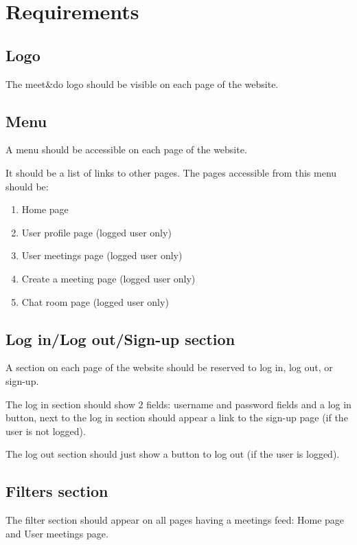 \documentclass[conference]{IEEEtran}
\begin{document}
\section{Requirements}

\subsection{Logo}

The meet\&do logo should be visible on each page of the website.

\subsection{Menu}

A menu should be accessible on each page of the website. 

It should be a list of links to other pages. 
The pages accessible from this menu should be:

\begin{enumerate}
    \item Home page
    \item User profile page (logged user only)
    \item User meetings page (logged user only)
    \item Create a meeting page (logged user only)
    \item Chat room page (logged user only)
\end{enumerate}

\subsection{Log in/Log out/Sign-up section}

A section on each page of the website should be reserved to log in, log out, or sign-up. 

The log in section should show 2 fields: username and password fields and a log in button, next to the log in section should appear a link to the sign-up page (if the user is not logged). 

The log out section should just show a button to log out (if the user is logged).

\subsection{Filters section}

The filter section should appear on all pages having a meetings feed: Home page and User meetings page.
\end{document}
